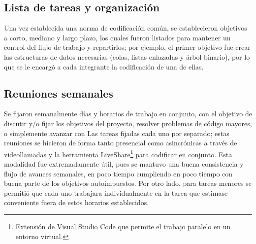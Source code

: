 \subsection{Lista de tareas y organización}
Una vez establecida una norma de codificación común, se establecieron objetivos a corto, mediano y largo plazo, los cuales fueron listados para mantener un control del flujo de trabajo y repartirlos; por ejemplo, el primer objetivo fue crear las estructuras de datos necesarias (colas, listas enlazadas y árbol binario), por lo que se le encargó a cada integrante la codificación de una de ellas.

\subsection{Reuniones semanales}

Se fijaron semanalmente días y horarios de trabajo en conjunto, con el objetivo de discutir y/o fijar los objetivos del proyecto, resolver problemas de código mayores, o simplemente avanzar con Las tareas fijadas cada uno por separado; estas reuniones se hicieron de forma tanto presencial como asincrónicas a través de videollamadas y la herramienta LiveShare\footnote{Extensión de Visual Studio Code que permite el trabajo paralelo en un entorno virtual.} para codificar en conjunto. Esta modalidad fue extremadamente útil, pues se mantuvo una buena consistencia y flujo de avances semanales, en poco tiempo cumpliendo en poco tiempo con buena parte de los objetivos autoimpuestos. Por otro lado, para tareas menores se permitió que cada uno trabajara individualmente en la tarea que estimase conveniente fuera de estos horarios establecidos.